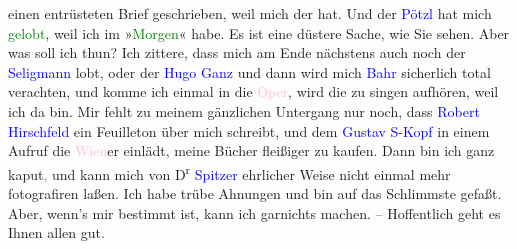                einen entrüsteten Brief geschrieben, weil mich der \label{K_L03489-5v}\label{K_L03489-5h} hat. Und der \textcolor{blue}{Pötzl}{}\ledrightnote{\textcolor{blue}{Eduard Pötzl}} hat mich \textcolor{green}{gelobt}{}\ledrightnote{{$\rightarrow$}\textcolor{green}{Das gelobte Wien}}, weil ich im »\textcolor{green}{Morgen}{}\ledrightnote{\textcolor{green}{Morgen. Wochenschrift für deutsche Kultur}}« \label{K_L03489-6v}\label{K_L03489-6h} habe. Es ist eine düstere
               Sache, wie Sie sehen. Aber was soll ich thun? Ich zittere, dass mich am Ende
               nächstens auch noch der \textcolor{blue}{Seligmann}{}\ledrightnote{\textcolor{blue}{Adalbert Franz Seligmann}} lobt, oder
               der \textcolor{blue}{Hugo Ganz}{}\ledrightnote{\textcolor{blue}{Hugo Ganz}} und dann wird mich \textcolor{blue}{Bahr}{}\ledrightnote{\textcolor{blue}{Hermann Bahr}} sicherlich total verachten, und komme ich
               einmal in die \textcolor{pink}{Oper}{}\ledrightnote{\textcolor{pink}{Oper}}, wird die \label{K_L03489-7v}\label{K_L03489-7h} zu singen aufhören, weil
               ich da bin. Mir fehlt zu meinem gänzlichen Untergang nur noch, dass \textcolor{blue}{Robert Hirschfeld}{}\ledrightnote{\textcolor{blue}{Robert Hirschfeld}} ein Feuilleton über mich schreibt, und dem
                  \textcolor{blue}{Gustav S-Kopf}{}\ledrightnote{\textcolor{blue}{Gustav Schwarzkopf}} in einem Aufruf die \textcolor{pink}{Wien}{}\ledrightnote{\textcolor{pink}{Wien}}er einlädt, meine Bücher fleißiger zu kaufen.
               Dann bin ich ganz kaput\textcolor{gray}{,} und kann mich von D\textsuperscript{r}{ }\textcolor{blue}{Spitzer}{}\ledrightnote{\textcolor{blue}{Friedrich Viktor Spitzer}} ehrlicher Weise nicht einmal mehr
               fotografiren laßen. Ich habe trübe Ahnungen und bin auf das Schlimmste gefaßt. Aber,
               wenn’s mir bestimmt ist, kann ich garnichts machen. – Hoffentlich geht es Ihnen allen
               gut.\pend
           
